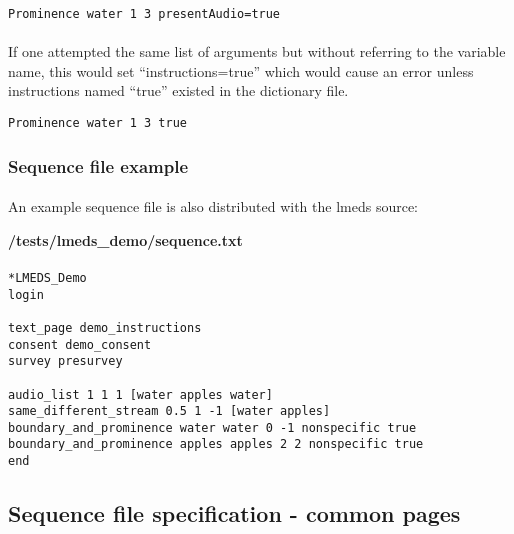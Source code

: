 \begin{lstlisting}
Prominence water 1 3 presentAudio=true
\end{lstlisting}

\paragraph{}
If one attempted the same list of arguments but without referring to the variable name, this would set ``instructions=true'' which would cause an error unless instructions named ``true'' existed in the dictionary file.

\begin{lstlisting}
Prominence water 1 3 true
\end{lstlisting}


\subsubsection{Sequence file example}
\label{sec:sequenceFileExample}

\paragraph{}
An example sequence file is also distributed with the lmeds source:

\textbf{/tests/lmeds\_demo/sequence.txt}

\paragraph{}

\begin{tcolorbox}[breakable,colback=white,colframe=blue,width=\dimexpr\textwidth+12mm\relax,enlarge left by=-6mm,enlarge right by=6mm]

\begin{lstlisting}
*LMEDS_Demo
login

text_page demo_instructions
consent demo_consent
survey presurvey

audio_list 1 1 1 [water apples water]
same_different_stream 0.5 1 -1 [water apples]
boundary_and_prominence water water 0 -1 nonspecific true
boundary_and_prominence apples apples 2 2 nonspecific true
end
\end{lstlisting}
\end{tcolorbox}

\subsection{Sequence file specification - common pages}
\label{sec:sequenceSpecBasic}

